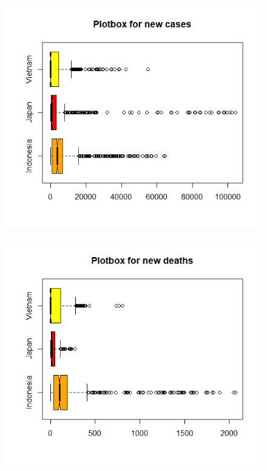 \documentclass[a4paper]{article}
\theoremstyle{definition}
\begin{document}
\begin{enumerate}[i)]
\begin{enumerate}[1)]
	\begin{figure}[h!]
		\begin{center}
		    \includegraphics[scale=0.8]{Images/II/ii7.png}
		\end{center}
	\end{figure}
	\begin{figure}[h!]
	    \begin{center}
		    \includegraphics[scale=0.8]{Images/II/ii7death.png}
		\end{center}
	\end{figure}
    

\end{enumerate}
\end{enumerate}
\end{document}
